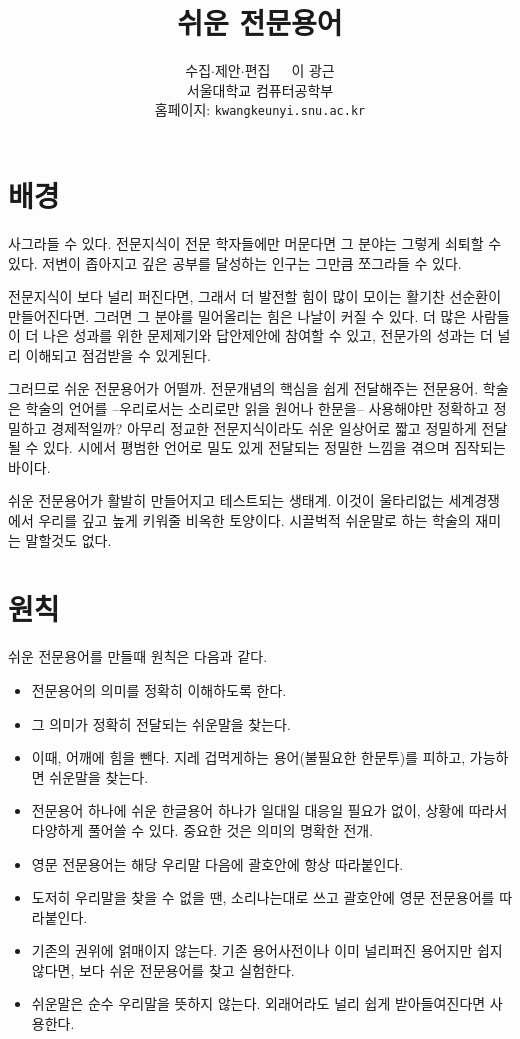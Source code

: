 \documentclass[11pt]{article}
\title{쉬운 전문용어}
\author{수집\(\cdot\)제안\(\cdot\)편집\ \ \  이 광근\\
  서울대학교 컴퓨터공학부\\
  홈페이지: \texttt{kwangkeunyi.snu.ac.kr}
}
\date{}
\begin{document}
\maketitle

\section*{배경}
사그라들 수 있다. 전문지식이 전문 학자들에만 머문다면 그 분야는
그렇게 쇠퇴할 수 있다. 저변이 좁아지고 깊은 공부를 달성하는 인구는
그만큼 쪼그라들 수 있다.

전문지식이 보다 널리 퍼진다면, 그래서 더 발전할 힘이 많이
모이는 활기찬 선순환이 만들어진다면. 그러면 그 분야를 밀어올리는 힘은 나날이
커질 수 있다. 더 많은 사람들이 더 나은 성과를 위한 문제제기와 답안제안에
참여할 수 있고, 전문가의 성과는 더 널리 이해되고 점검받을 수 있게된다.

그러므로 쉬운 전문용어가 어떨까. 전문개념의 핵심을 쉽게 전달해주는
전문용어. 학술은 학술의 언어를 --우리로서는 소리로만 읽을 원어나
한문을-- 사용해야만 정확하고 정밀하고 경제적일까? 아무리 정교한
전문지식이라도 쉬운 일상어로 짧고 정밀하게 전달될 수 있다. 시에서
평범한 언어로 밀도 있게 전달되는 정밀한 느낌을 겪으며 짐작되는 바이다.

쉬운 전문용어가 활발히 만들어지고 테스트되는 생태계.
이것이 울타리없는 세계경쟁에서 우리를 깊고 높게 키워줄 비옥한
토양이다. 시끌벅적 쉬운말로 하는 학술의 재미는 말할것도 없다.

\section*{원칙}
쉬운 전문용어를 만들때 원칙은 다음과 같다.
\begin{itemize}
\item 전문용어의 의미를 정확히 이해하도록 한다.
\item 그 의미가 정확히 전달되는 쉬운말을 찾는다.
\item 이때, 어깨에 힘을 뺀다. 지레 겁먹게하는 용어(불필요한 한문투)를
  피하고, 가능하면 쉬운말을 찾는다.
\item 전문용어 하나에 쉬운 한글용어 하나가 일대일 대응일 필요가 없이,
  상황에 따라서 다양하게 풀어쓸 수 있다. 중요한 것은 의미의 명확한
  전개.
\item 영문 전문용어는 해당 우리말 다음에 괄호안에 항상 따라붙인다.
\item 도저히 우리말을 찾을 수 없을 땐, 소리나는대로 쓰고 괄호안에 영문
  전문용어를 따라붙인다.
\item 기존의 권위에 얽매이지 않는다. 기존 용어사전이나 이미 널리퍼진
  용어지만 쉽지않다면, 보다 쉬운 전문용어를 찾고 실험한다.
\item 쉬운말은 순수 우리말을 뜻하지 않는다. 외래어라도 널리 쉽게
  받아들여진다면 사용한다.
\end{itemize}



\printindex
\end{document}
